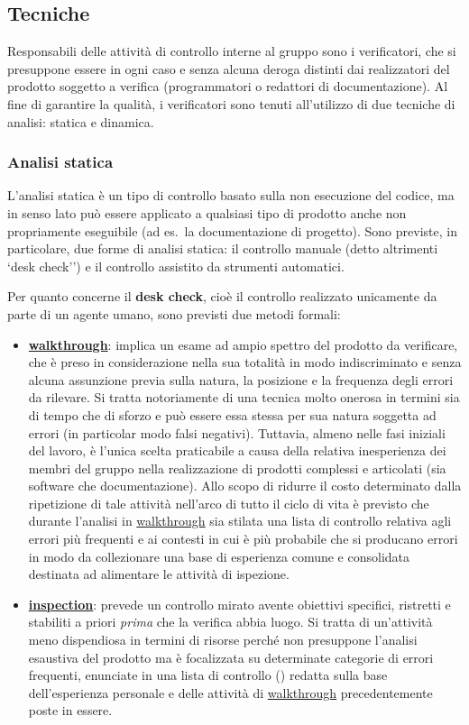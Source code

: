 
\subsection{Tecniche}
Responsabili delle attività di controllo interne al gruppo sono i verificatori, che si presuppone essere in ogni caso e senza alcuna deroga distinti dai realizzatori del prodotto soggetto a verifica (programmatori o redattori di documentazione). Al fine di garantire la qualità, i verificatori sono tenuti all'utilizzo di due tecniche di analisi: statica e dinamica.

\subsubsection{Analisi statica}
L'analisi statica è un tipo di controllo basato sulla non esecuzione del codice, ma in senso lato può essere applicato a qualsiasi tipo di prodotto anche non propriamente eseguibile (ad es.~la documentazione di progetto). Sono previste, in particolare, due forme di analisi statica: il controllo manuale (detto altrimenti `desk check'') e il controllo assistito da strumenti automatici.

Per quanto concerne il \textbf{desk check}, cioè il controllo realizzato unicamente da parte di un agente umano, sono previsti due metodi formali:
\begin{itemize}
  \item \textbf{\underline{walkthrough}}: implica un esame ad ampio spettro del prodotto da verificare, che è preso in considerazione nella sua totalità in modo indiscriminato e senza alcuna assunzione previa sulla natura, la posizione e la frequenza degli errori da rilevare. Si tratta notoriamente di una tecnica molto onerosa in termini sia di tempo che di sforzo e può essere essa stessa per sua natura soggetta ad errori (in particolar modo falsi negativi). Tuttavia, almeno nelle fasi iniziali del lavoro, è l'unica scelta praticabile a causa della relativa inesperienza dei membri del gruppo nella realizzazione di prodotti complessi e articolati (sia software che documentazione). Allo scopo di ridurre il costo determinato dalla ripetizione di tale attività nell'arco di tutto il ciclo di vita è previsto che durante l'analisi in \underline{walkthrough} sia stilata una lista di controllo relativa agli errori più frequenti e ai contesti in cui è più probabile che si producano errori in modo da collezionare una base di esperienza comune e consolidata destinata ad alimentare le attività di ispezione.
  \item \textbf{\underline{inspection}}: prevede un controllo mirato avente obiettivi specifici, ristretti e stabiliti a priori \emph{prima} che la verifica abbia luogo. Si tratta di un'attività meno dispendiosa in termini di risorse perché non presuppone l'analisi esaustiva del prodotto ma è focalizzata su determinate categorie di errori frequenti, enunciate in una lista di controllo () redatta sulla base dell'esperienza personale e delle attività di \underline{walkthrough} precedentemente poste in essere.
\end{itemize}

